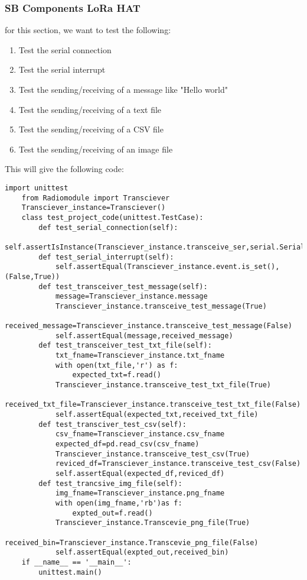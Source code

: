 \subsubsection{SB Components LoRa HAT}
for this section, we want to test the following:
\begin{enumerate}
    \item Test the serial connection
    \item Test the serial interrupt
    \item Test the sending/receiving of a message like "Hello world"
    \item Test the sending/receiving of a text file 
    \item Test the sending/receiving of a CSV file
    \item Test the sending/receiving of an image file
\end{enumerate}
This will give  the following code:
\begin{lstlisting}[style=mystyle]
    import unittest
    from Radiomodule import Transciever
    Transciever_instance=Transciever()
    class test_project_code(unittest.TestCase):
        def test_serial_connection(self):
            self.assertIsInstance(Transciever_instance.transceive_ser,serial.Serial)
        def test_serial_interrupt(self):
            self.assertEqual(Transciever_instance.event.is_set(),(False,True))
        def test_transceiver_test_message(self):
            message=Transciever_instance.message
            Transciever_instance.transceive_test_message(True)
            received_message=Transciever_instance.transceive_test_message(False)
            self.assertEqual(message,received_message)
        def test_transceiver_test_txt_file(self):
            txt_fname=Transciever_instance.txt_fname
            with open(txt_file,'r') as f:
                expected_txt=f.read()
            Transciever_instance.transceive_test_txt_file(True)
            received_txt_file=Transciever_instance.transceive_test_txt_file(False)
            self.assertEqual(expected_txt,received_txt_file)
        def test_transciver_test_csv(self):
            csv_fname=Transciever_instance.csv_fname
            expected_df=pd.read_csv(csv_fname)
            Transciever_instance.transceive_test_csv(True)
            reviced_df=Transciever_instance.transceive_test_csv(False)
            self.assertEqual(expected_df,reviced_df)
        def test_trancsive_img_file(self):
            img_fname=Transciever_instance.png_fname
            with open(img_fname,'rb')as f:
                expted_out=f.read()
            Transciever_instance.Transcevie_png_file(True)
            received_bin=Transciever_instance.Transcevie_png_file(False)
            self.assertEqual(expted_out,received_bin)
    if __name__ == '__main__':
        unittest.main()
\end{lstlisting}
